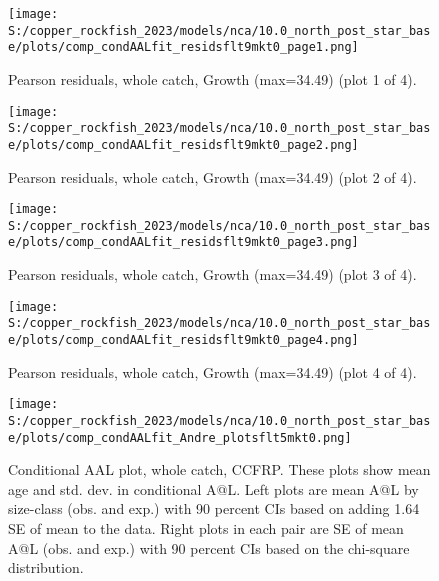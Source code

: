 \documentclass[11pt,
  letterpaper,
]{article}
\begin{document}
\begin{figure}
{\centering
\texttt{[image: S:/copper\_rockfish\_2023/models/nca/10.0\_north\_post\_star\_base/plots/comp\_condAALfit\_residsflt9mkt0\_page1.png]}
}
\caption{Pearson residuals, whole catch, Growth (max=34.49) (plot 1 of 4).\label{fig:comp-condAALfit-residsflt9mkt0-page1}}
\end{figure}

\begin{figure}
{\centering
\texttt{[image: S:/copper\_rockfish\_2023/models/nca/10.0\_north\_post\_star\_base/plots/comp\_condAALfit\_residsflt9mkt0\_page2.png]}
}
\caption{Pearson residuals, whole catch, Growth (max=34.49) (plot 2 of 4).\label{fig:comp-condAALfit-residsflt9mkt0-page2}}
\end{figure}

\begin{figure}
{\centering
\texttt{[image: S:/copper\_rockfish\_2023/models/nca/10.0\_north\_post\_star\_base/plots/comp\_condAALfit\_residsflt9mkt0\_page3.png]}
}
\caption{Pearson residuals, whole catch, Growth (max=34.49) (plot 3 of 4).\label{fig:comp-condAALfit-residsflt9mkt0-page3}}
\end{figure}

\begin{figure}
{\centering
\texttt{[image: S:/copper\_rockfish\_2023/models/nca/10.0\_north\_post\_star\_base/plots/comp\_condAALfit\_residsflt9mkt0\_page4.png]}
}
\caption{Pearson residuals, whole catch, Growth (max=34.49) (plot 4 of 4).\label{fig:comp-condAALfit-residsflt9mkt0-page4}}
\end{figure}

\begin{figure}
{\centering
\texttt{[image: S:/copper\_rockfish\_2023/models/nca/10.0\_north\_post\_star\_base/plots/comp\_condAALfit\_Andre\_plotsflt5mkt0.png]}
}
\caption{Conditional AAL plot, whole catch, CCFRP. These plots show mean age and std. dev. in conditional A@L. Left plots are mean A@L by size-class (obs. and exp.) with 90 percent CIs based on adding 1.64 SE of mean to the data. Right plots in each pair are SE of mean A@L (obs. and exp.) with 90 percent CIs based on the chi-square distribution.\label{fig:comp-condAALfit-Andre-plotsflt5mkt0}}
\end{figure}
\end{document}
